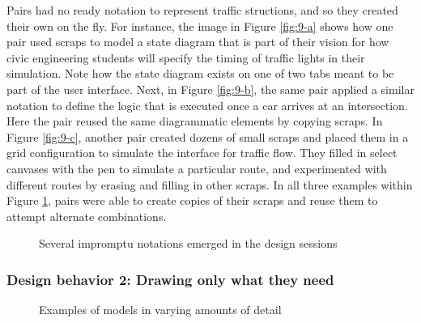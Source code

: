 \documentclass[12pt,fleqn]{ucithesis}
\begin{document}
Pairs had no ready notation to represent traffic structions, and so they created their own on the fly. For instance, the image in Figure \ref{fig:9-a} shows how one pair used scraps to model a state diagram that is part of their vision for how civic engineering students will specify the timing of traffic lights in their simulation. Note how the state diagram exists on one of two tabs meant to be part of the user interface. Next, in Figure \ref{fig:9-b}, the same pair applied a similar notation to define the logic that is executed once a car arrives at an intersection. Here the pair reused the same diagrammatic elements by copying scraps. In Figure \ref{fig:9-c}, another pair created dozens of small scraps and placed them in a grid configuration to simulate the interface for traffic flow. They filled in select canvases with the pen to simulate a particular route, and experimented with different routes by erasing and filling in other scraps. In all three examples within Figure \ref{fig:9}, pairs were able to create copies of their scraps and reuse them to attempt alternate combinations. 

\begin{figure}%
  \centering
   \caption {Several impromptu notations emerged in the design sessions}
   \label{fig:9}
\end{figure}%

\subsubsection{Design behavior 2: Drawing only what they need}
\label{results:22}

\begin{figure}%
  \centering
   \caption {Examples of models in varying amounts of detail}
   \label{fig:8}
\end{figure}%
\end{document}
